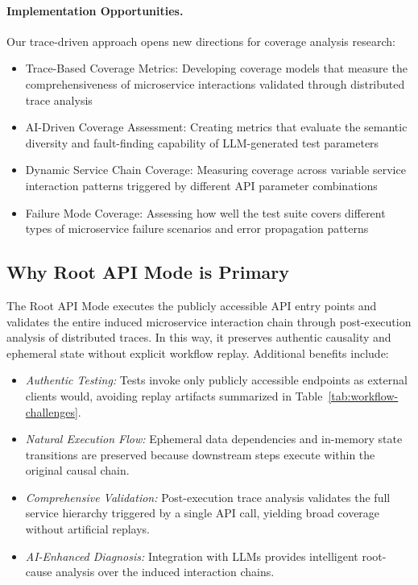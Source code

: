 \documentclass[conference]{IEEEtran}
\begin{document}
\paragraph{Implementation Opportunities.}
Our trace-driven approach opens new directions for coverage analysis research:
\begin{itemize}[leftmargin=*]
    \item {Trace-Based Coverage Metrics:} Developing coverage models that measure the comprehensiveness of microservice interactions validated through distributed trace analysis
    \item {AI-Driven Coverage Assessment:} Creating metrics that evaluate the semantic diversity and fault-finding capability of LLM-generated test parameters
    \item {Dynamic Service Chain Coverage:} Measuring coverage across variable service interaction patterns triggered by different API parameter combinations
    \item {Failure Mode Coverage:} Assessing how well the test suite covers different types of microservice failure scenarios and error propagation patterns
\end{itemize}


\subsection{Why \textbf{Root API Mode} is Primary}\label{ssec:root-benefits}

The Root API Mode executes the publicly accessible API entry points and validates the entire induced microservice interaction chain through post-execution analysis of distributed traces. In this way, it preserves authentic causality and ephemeral state without explicit workflow replay. Additional benefits include:

\begin{itemize}[leftmargin=*]
  \item \emph{Authentic Testing:} Tests invoke only publicly accessible endpoints as external clients would, avoiding replay artifacts summarized in Table~\ref{tab:workflow-challenges}.
  \item \emph{Natural Execution Flow:} Ephemeral data dependencies and in-memory state transitions are preserved because downstream steps execute within the original causal chain.
  \item \emph{Comprehensive Validation:} Post-execution trace analysis validates the full service hierarchy triggered by a single API call, yielding broad coverage without artificial replays.
  \item \emph{AI-Enhanced Diagnosis:} Integration with LLMs provides intelligent root-cause analysis over the induced interaction chains.
\end{itemize}
\end{document}
